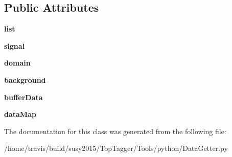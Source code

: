 \subsection*{Public Attributes}
\begin{DoxyCompactItemize}
\item 
\hypertarget{classDataGetter_1_1DataGetter_a2739938ac344ad65b1d2e25e2c787419}{{\bfseries list}}\label{classDataGetter_1_1DataGetter_a2739938ac344ad65b1d2e25e2c787419}

\item 
\hypertarget{classDataGetter_1_1DataGetter_a7e7816b063af6cb91da3d8aa8d48fc2b}{{\bfseries signal}}\label{classDataGetter_1_1DataGetter_a7e7816b063af6cb91da3d8aa8d48fc2b}

\item 
\hypertarget{classDataGetter_1_1DataGetter_a0d579f0002f299b988848850aabddad8}{{\bfseries domain}}\label{classDataGetter_1_1DataGetter_a0d579f0002f299b988848850aabddad8}

\item 
\hypertarget{classDataGetter_1_1DataGetter_ab04199c95788aae9665d4c1b2677b6eb}{{\bfseries background}}\label{classDataGetter_1_1DataGetter_ab04199c95788aae9665d4c1b2677b6eb}

\item 
\hypertarget{classDataGetter_1_1DataGetter_a9d4f5ce1a7aae31b19aa9171cb0b62ac}{{\bfseries buffer\-Data}}\label{classDataGetter_1_1DataGetter_a9d4f5ce1a7aae31b19aa9171cb0b62ac}

\item 
\hypertarget{classDataGetter_1_1DataGetter_ad47a039976844990578f9b9d5e2301c3}{{\bfseries data\-Map}}\label{classDataGetter_1_1DataGetter_ad47a039976844990578f9b9d5e2301c3}

\end{DoxyCompactItemize}


The documentation for this class was generated from the following file\-:\begin{DoxyCompactItemize}
\item 
/home/travis/build/susy2015/\-Top\-Tagger/\-Tools/python/Data\-Getter.\-py\end{DoxyCompactItemize}
